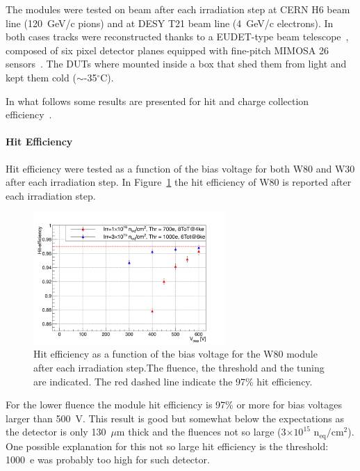 The modules were tested on beam after each irradiation step at CERN H6 beam line (120~GeV/c pions) and at DESY T21 beam line (4~GeV/c electrons).
 In both cases tracks were reconstructed thanks to  a EUDET-type beam telescope~\cite{Jansen2016}, 
 composed of six pixel detector planes equipped with fine-pitch MIMOSA 26 sensors~\cite{mimosa26}. 
 The DUTs where mounted inside a box that shed them from light and kept them cold 
 ($\sim$-35$^{\circ}$C).
 
\noindent In what follows some results are presented for hit and charge collection efficiency~\cite{TrentoWS2017,AudreyPSD11}.


\paragraph{Hit Efficiency}
Hit efficiency were tested as a function of the bias voltage for both W80 and W30 after each irradiation 
step. In Figure~\ref{fig:Hit_Eff_W80} the hit efficiency of W80 is reported after each irradiation step.



\begin{figure}[!htpb]
\centering
\includegraphics[width=0.65\textwidth]{new2Hit_Eff_W80.pdf}
\caption{\label{fig:Hit_Eff_W80}Hit efficiency as a function of the bias voltage for the W80 module after each irradiation step.The fluence, the threshold and the tuning 
are indicated. The red dashed line indicate the 97\% 
hit efficiency.}
\end{figure}

For the lower fluence the module hit efficiency is  97\% or more for bias voltages larger than 500~V.  This result is good 
but somewhat below the expectations as the detector is  only 130~$\mu$m thick and the fluences 
not so large (3$\times 10^{15}$ n$_\text{eq}/\text{cm}^2$). One possible explanation for this not 
so large hit efficiency is the threshold: 1000~e was probably too high for such detector. 

